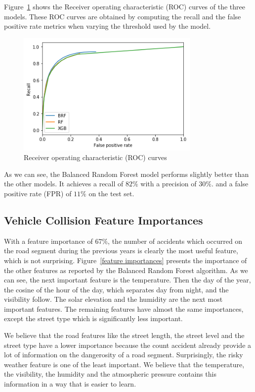 \documentclass[conference]{IEEEtran}
\begin{document}
Figure~\ref{fig:roc} shows the Receiver operating characteristic (ROC) curves of the three models. These ROC curves are obtained by computing the recall and the false positive rate metrics when varying the
threshold used by the model.

\begin{figure}[htbp]
\centerline{\includegraphics[height=6cm, keepaspectratio]{figures/roc.png}}
\caption{Receiver operating characteristic (ROC) curves}
\label{fig:roc}
\end{figure}

As we can see, the Balanced Random Forest model performs slightly better than the other models.
It achieves a recall of $82\%$ with a precision of $30\%$. and a false positive rate (FPR) of $11\%$ on the test set.

\subsection{Vehicle Collision Feature Importances}
With a
feature importance of $67\%$, the number of accidents which occurred on the
road segment during the previous years is clearly the most useful feature, which
is not surprising. Figure~\ref{feature importances} presents the
importance of the other features as reported by the Balanced Random Forest
algorithm. As we can see, the next important feature is the temperature. 
Then the day of the year, the cosine of the hour of the day, which separates day from night,
and the visibility follow. The solar elevation and the humidity are the next most important features. The remaining features have almost the same importances, except the street type which
is significantly less important.

We believe that the road features like the street length, the street level and the street type have a lower importance because the count accident already provide a lot of information on the dangerosity of a road segment. Surprisingly, the risky weather feature is one of the least important. We believe that the temperature, the visibility, the humidity and the atmospheric pressure contains this information in a way that is easier to learn. 
\end{document}
